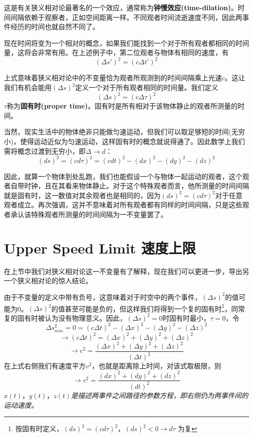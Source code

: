这是有关狭义相对论最著名的一个效应，通常称为{\bf{钟慢效应(time-dilation)}}。时间间隔依赖于观察者，正如空间距离一样。不同观者时间流逝速度不同，因此两事件经历的时间也就自然不同了。

现在时间将变为一个相对的概念，如果我们能找到一个对于所有观者都相同的时间量，这将会非常有用。在上述例子中，第二位观者与物体有相同的速度，有
\begin{equation}\label{eq2.17}
  (\Delta s')^2
  =(c\Delta t')^2
\end{equation}

上式意味着狭义相对论中的不变量恰为观者所观测到的时间间隔乘上光速$c$。这让我们有机会能用$(\Delta s)^2$定义一个对于所有观者相同的时间量。我们定义
\begin{equation}\label{eq2.18}
  (\Delta s)^2
  =(c\Delta \tau)^2
\end{equation}
$\tau$称为{\bf{固有时(proper time)}}。固有时是所有相对于该物体静止的观者所测量的时间。

当然，现实生活中的物体绝非只能做匀速运动，但我们可以取足够短的时间(无穷小)，使得运动近似为匀速运动，这样固有时的概念就说得通了。因此数学上我们需将概念过渡到无穷小，即$\Delta \rightarrow d$：
\begin{equation}\label{eq2.19}
  (ds)^2  =(cd \tau )^2=(cdt)^2-(dx)^2-(dy)^2-(dz)^2
\end{equation}

因此，就算一个物体到处乱跑，我们也能假设一个与物体一起运动的观者，这个观者自带时钟，且在其看来物体静止。对于这个特殊观者而言，他所测量的时间间隔就是固有时，这一数值对其余观者也是相同的，因为$(ds)^2=(cd\tau)^2$对于任意观者成立。再次强调，这并不意味着对所有观者都有同样的时间间隔，只是这些观者承认该特殊观者所测量的时间间隔为一不变量罢了。

\section[速度上限]{Upper Speed Limit 速度上限}
\label{sec2.3}
在上节中我们对狭义相对论这一不变量有了解释，现在我们可以更进一步，导出另一个狭义相对论的惊人结论。

由于不变量的定义中带有负号，这意味着对于时空中的两个事件，$(\Delta s)^2$的值可能为0。$(\Delta s)^2$的值甚至可能是负的，但这样我们将得到一个复的固有时\footnote{按固有时定义，$(ds)^2=(cd\tau)^2$，$(ds)^2 < 0 \rightarrow d\tau$ 为复}，同常复的固有时被认为没有物理意义。因此，$(\Delta s)^2=0$时固有时最小，$\tau=0$，令
\[
\Delta s^2_{min}
=0=(c \Delta t)^2-(\Delta x)^2-(\Delta y)^2-(\Delta z)^2
\]
\[
\rightarrow (c \Delta t)^2
=(\Delta x)^2+(\Delta y)^2+(\Delta z)^2
\]
\begin{equation}\label{eq2.20}
 \rightarrow c^2=
  \frac{(\Delta x)^2+(\Delta y)^2+(\Delta z)^2}{(\Delta t)^2}
\end{equation}
在上式右侧我们有速度平方$v^2$，也就是距离除上时间，对该式取极限，则
\begin{equation}\label{eq2.21}
 \rightarrow c^2=\frac{(d x)^2+(d y)^2+(d z)^2}{(dt)^2}
\end{equation}
$x(t)$，$y(t)$，$z(t)${\it{是描述两事件之间路径的参数方程，即右侧仍为两事件间的运动速度。}}%

